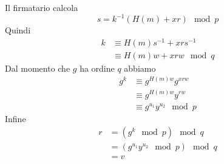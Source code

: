 \documentclass[14pt]{extarticle}
\begin{document}
    \bigskip
    Il firmatario calcola
    \begin{equation*}
        s = k^{-1}(H(m) + xr) \mod p
    \end{equation*}
    Quindi
    \begin{align*}
        k &\equiv H(m)s^{-1} + xrs^{-1}\\
          &\equiv H(m)w + xrw \mod q
    \end{align*}
    Dal momento che $g$ ha ordine $q$ abbiamo
    \begin{align*}
        g^k &\equiv g^{H(m)w}g^{xrw}\\
            &\equiv g^{H(m)w}y^{rw}\\
            &\equiv g^{u_1}y^{u_2} \mod p
    \end{align*}
    Infine
    \begin{align*}
        r &= (g^k \mod p) \mod q\\
          &= (g^{u_1}y^{u_2} \mod p) \mod q\\
          &= v
    \end{align*}
\end{document}
